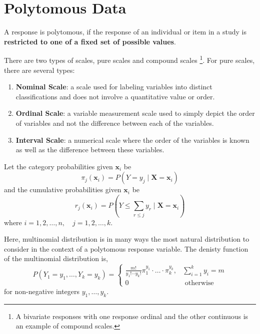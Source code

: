 \section{Polytomous Data}

\begin{definition}
    A response is polytomous, if the response of an individual or item in a study is \textbf{restricted to one of a fixed set of possible values}.
\end{definition}

\begin{remark}
    There are two types of scales, pure scales and compound scales \footnote{A bivariate responses with one response ordinal and the other continuous is an example of compound scales.}. For pure scales, there are several types:
    \begin{enumerate}
        \item \textbf{Nominal Scale}: a scale used for labeling variables into distinct classifications and does not involve a quantitative value or order.
        \item \textbf{Ordinal Scale}: a variable measurement scale used to simply depict the order of variables and not the difference between each of the variables.
        \item \textbf{Interval Scale}: a numerical scale where the order of the variables is known as well as the difference between these variables.
    \end{enumerate}
\end{remark}

Let the category probabilities given $\mathbf{x}_{i}$ be
\begin{equation}
    \pi_{j}\left(\mathbf{x}_{i}\right)=P\left(Y=y_{j}\mid\mathbf{X}=\mathbf{x}_{i}\right)
\end{equation}
and the cumulative probabilities given $\mathbf{x}_{i}$ be
\begin{equation}
    r_{j}\left(\mathbf{x}_{i}\right)=P\left(Y\leq\sum_{r\leq j}y_{r}\mid\mathbf{X}=\mathbf{x}_{i}\right)
\end{equation}
where $i=1,2,\ldots,n,\quad j=1,2,\ldots,k$.

Here, multinomial distribution is in many ways the most natural distribution to consider in the context of a polytomous response variable. The denisty function of the multinomial distribution is,
\begin{equation*}
    P\left(Y_{1}=y_{1},\ldots,Y_{k}=y_{k}\right)=
    \left\{\begin{array}{ll}
        \frac{m!}{y_{1}!\cdots y_{k}!}\pi_{1}^{y_{1}}\cdot\ldots\cdot \pi_{k}^{y_{k}}, & \sum_{i=1}^{k}y_{i}=m \\
        0                                                                              & \text { otherwise }
    \end{array}\right.
\end{equation*}
for non-negative integers $y_{1},\ldots,y_{k}$.

